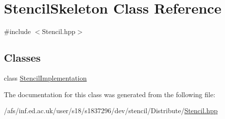\hypertarget{classStencilSkeleton}{\section{Stencil\-Skeleton Class Reference}
\label{classStencilSkeleton}
}


{\ttfamily \#include $<$Stencil.\-hpp$>$}

\subsection*{Classes}
\begin{DoxyCompactItemize}
\item 
class \hyperlink{classStencilSkeleton_1_1StencilImplementation}{Stencil\-Implementation}
\end{DoxyCompactItemize}


The documentation for this class was generated from the following file\-:\begin{DoxyCompactItemize}
\item 
/afs/inf.\-ed.\-ac.\-uk/user/s18/s1837296/dev/stencil/\-Distribute/\hyperlink{Stencil_8hpp}{Stencil.\-hpp}\end{DoxyCompactItemize}

